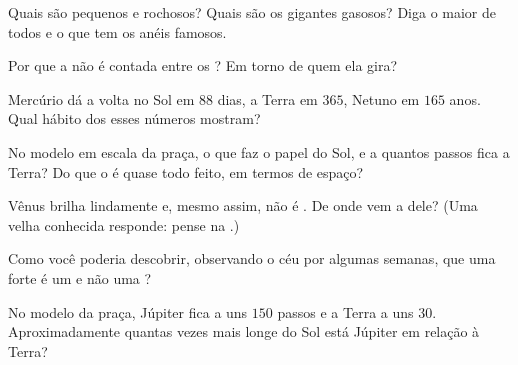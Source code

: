 \begin{exercise}[$\star$]\label{exo:g4:solar-system:3}
Quais  são pequenos e rochosos? Quais são os gigantes
gasosos? Diga o maior de todos e o que tem os anéis famosos.
\end{exercise}

\begin{exercise}[$\star$]\label{exo:g4:solar-system:4}
Por que a  não é contada entre os ? Em torno de quem ela
gira?
\end{exercise}

\begin{exercise}[$\star$]\label{exo:g4:solar-system:5}
Mercúrio dá a volta no Sol em $88$ dias, a Terra em $365$, Netuno em
$165$ anos. Qual hábito dos  esses números mostram?
\end{exercise}

\begin{exercise}[$\star$]\label{exo:g4:solar-system:6}
No modelo em escala da praça, o que faz o papel do Sol, e a quantos
passos fica a Terra? Do que o  é quase todo feito, em
termos de espaço?
\end{exercise}

\begin{exercise}[$\star$]\label{exo:g4:solar-system:7}
Vênus brilha lindamente e, mesmo assim, não é . De onde vem a
 dele? (Uma velha conhecida responde: pense na .)
\end{exercise}

\begin{exercise}[$\star$]\label{exo:g4:solar-system:8}
Como você poderia descobrir, observando o céu por algumas semanas,
que uma  forte é um  e não uma ?
\end{exercise}

\begin{exercise}[$\star$]\label{exo:g4:solar-system:9}
No modelo da praça, Júpiter fica a uns $150$ passos e a Terra a uns
$30$. Aproximadamente quantas vezes mais longe do Sol está Júpiter em
relação à Terra?
\end{exercise}

